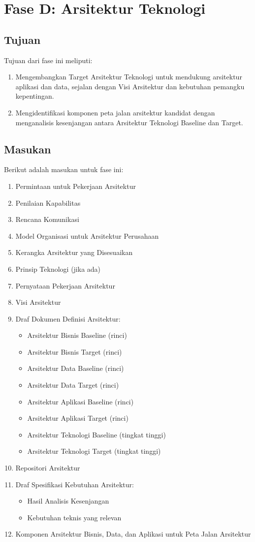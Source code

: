\chapter{Fase D: Arsitektur Teknologi}

\section{Tujuan}
Tujuan dari fase ini meliputi:
\begin{enumerate}
	\item Mengembangkan Target Arsitektur Teknologi untuk mendukung arsitektur aplikasi dan data, sejalan dengan Visi Arsitektur dan kebutuhan pemangku kepentingan.
	\item Mengidentifikasi komponen peta jalan arsitektur kandidat dengan menganalisis kesenjangan antara Arsitektur Teknologi Baseline dan Target.
\end{enumerate}

\section{Masukan}
Berikut adalah masukan untuk fase ini:
\begin{enumerate}
	\item Permintaan untuk Pekerjaan Arsitektur
	\item Penilaian Kapabilitas
	\item Rencana Komunikasi
	\item Model Organisasi untuk Arsitektur Perusahaan
	\item Kerangka Arsitektur yang Disesuaikan
	\item Prinsip Teknologi (jika ada)
	\item Pernyataan Pekerjaan Arsitektur
	\item Visi Arsitektur
	\item Draf Dokumen Definisi Arsitektur:
	\begin{itemize}
		\item Arsitektur Bisnis Baseline (rinci)
		\item Arsitektur Bisnis Target (rinci)
		\item Arsitektur Data Baseline (rinci)
		\item Arsitektur Data Target (rinci)
		\item Arsitektur Aplikasi Baseline (rinci)
		\item Arsitektur Aplikasi Target (rinci)
		\item Arsitektur Teknologi Baseline (tingkat tinggi)
		\item Arsitektur Teknologi Target (tingkat tinggi)
	\end{itemize}
	\item Repositori Arsitektur
	\item Draf Spesifikasi Kebutuhan Arsitektur:
	\begin{itemize}
		\item Hasil Analisis Kesenjangan
		\item Kebutuhan teknis yang relevan
	\end{itemize}
	\item Komponen Arsitektur Bisnis, Data, dan Aplikasi untuk Peta Jalan Arsitektur
\end{enumerate}

